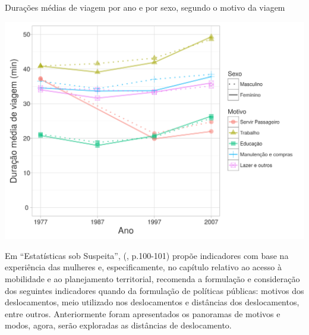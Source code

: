 \begin{grafico}[htb]%
    \caption{\label{graf:duracao-motivo}Durações médias de viagem por ano e por sexo, segundo o motivo da viagem}%
    \begin{center}%
        \includegraphics[width=1\textwidth]{./imagens/duracao-motivo.png}%
    \end{center}%
\end{grafico}%


Em ``Estatísticas sob Suspeita'',  (\citeyear{CARRASCO2012}, p.100-101) propõe indicadores com base na experiência das mulheres e, especificamente, no capítulo relativo ao acesso à mobilidade e ao planejamento territorial, recomenda a formulação e consideração dos seguintes indicadores quando da formulação de políticas públicas:
motivos dos deslocamentos, meio utilizado nos deslocamentos e distâncias dos deslocamentos, entre outros.
Anteriormente foram apresentados os panoramas de motivos e modos, agora, serão exploradas as distâncias de deslocamento.

